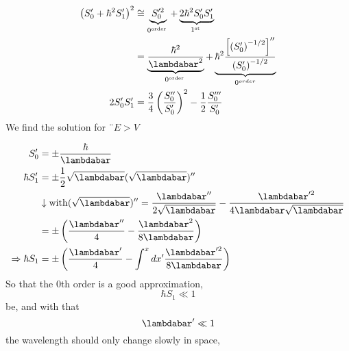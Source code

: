 \begin{equation}
\begin{aligned}\left(S_{0}^{\prime}+\hbar^{2} S_{1}^{\prime}\right)^{2} & \cong \underbrace{S_{0}^{\prime 2}}_{0^{\text {order }}}+\underbrace{2 \hbar^{2} S_{0}^{\prime} S_{1}^{\prime}}_{1^{\text {st }}} \\ &=\underbrace{\frac{\hbar^{2}}{\lambdabar^{2}}}_{0^\text {order }}+\underbrace{\hbar^{2} \frac{\left[\left(S_{0}^{\prime}\right)^{-1 / 2}\right]^{\prime \prime}}{\left(S_{0}^{\prime}\right)^{-1 / 2}}}_{\text 0^{order }} \\ 2 S_{0}^{\prime} S_{1}^{\prime} &=\frac{3}{4}\left(\frac{S_{0}^{\prime \prime}}{S_{0}^{\prime}}\right)^{2}-\frac{1}{2} \frac{S_{0}^{\prime \prime \prime}}{S_{0}^{\prime}} \end{aligned}
\end{equation}
We find the solution for $¨ E> V$

\begin{equation}
\begin{aligned} S_{0}^{\prime} &=\pm \frac{\hbar}{\lambdabar} \\ \hbar S_{1}^{\prime} &=\pm \frac{1}{2} \sqrt{\lambdabar}(\sqrt{\lambdabar})^{\prime \prime} \\ & \downarrow \operatorname{with}(\sqrt{\lambdabar})^{\prime \prime}=\frac{\lambdabar^{\prime \prime}}{2 \sqrt{\lambdabar}}-\frac{\lambdabar^{\prime 2}}{4 \lambdabar \sqrt{\lambdabar}} \\ &=\pm\left(\frac{\lambdabar^{\prime \prime}}{4}-\frac{\lambdabar^{2}}{8 \lambdabar}\right) \\ \Rightarrow \hbar S_{1} &=\pm\left(\frac{\lambdabar^{\prime}}{4}-\int^{x} d x^{\prime} \frac{\lambdabar^{\prime 2}}{8 \lambdabar}\right) \end{aligned}
\end{equation}
So that the 0th order is a good approximation,
\begin{equation}
    \hbar S_1\ll 1
\end{equation}
be, and with that
\begin{equation}
    \lambdabar'\ll 1
\end{equation}
the wavelength should only change slowly in space,

